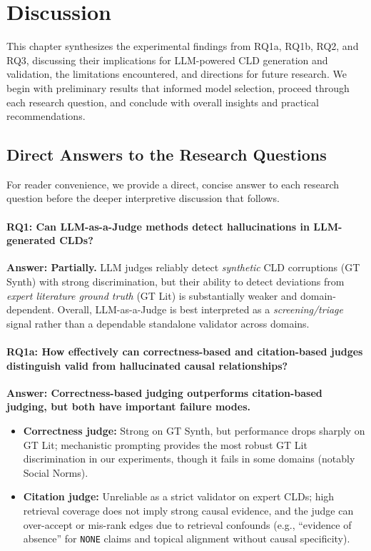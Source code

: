 \chapter{Discussion}
\label{sec:discussion}

This chapter synthesizes the experimental findings from RQ1a, RQ1b, RQ2, and RQ3, discussing their implications for LLM-powered CLD generation and validation, the limitations encountered, and directions for future research. We begin with preliminary results that informed model selection, proceed through each research question, and conclude with overall insights and practical recommendations.

\section{Direct Answers to the Research Questions}
\label{sec:discussion_rq_answers}
For reader convenience, we provide a direct, concise answer to each research question before the deeper interpretive discussion that follows.

\subsubsection*{RQ1: Can LLM-as-a-Judge methods detect hallucinations in LLM-generated CLDs?}
\textbf{Answer: Partially.} LLM judges reliably detect \textit{synthetic} CLD corruptions (GT Synth) with strong discrimination, but their ability to detect deviations from \textit{expert literature ground truth} (GT Lit) is substantially weaker and domain-dependent. Overall, LLM-as-a-Judge is best interpreted as a \textit{screening/triage} signal rather than a dependable standalone validator across domains.

\subsubsection*{RQ1a: How effectively can correctness-based and citation-based judges distinguish valid from hallucinated causal relationships?}
\textbf{Answer: Correctness-based judging outperforms citation-based judging, but both have important failure modes.}
\begin{itemize}[noitemsep]
    \item \textbf{Correctness judge:} Strong on GT Synth, but performance drops sharply on GT Lit; mechanistic prompting provides the most robust GT Lit discrimination in our experiments, though it fails in some domains (notably Social Norms).
    \item \textbf{Citation judge:} Unreliable as a strict validator on expert CLDs; high retrieval coverage does not imply strong causal evidence, and the judge can over-accept or mis-rank edges due to retrieval confounds (e.g., ``evidence of absence'' for \texttt{NONE} claims and topical alignment without causal specificity).
\end{itemize}

